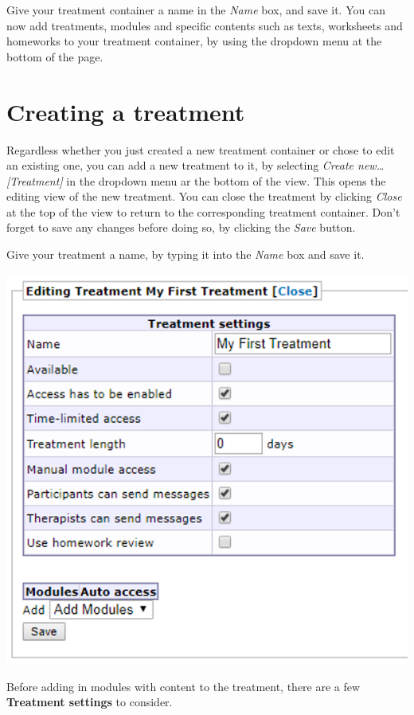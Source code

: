 \documentclass[
]{book}
\begin{document}
Give your treatment container a name in the \emph{Name} box, and save it.
You can now add treatments, modules and specific contents such as texts, worksheets and homeworks to your treatment container, by using the dropdown menu at the bottom of the page.

\section{Creating a treatment}\label{creating-a-treatment}

Regardless whether you just created a new treatment container or chose to edit an existing one, you can add a new treatment to it, by selecting \emph{Create new\ldots{} {[}Treatment{]}} in the dropdown menu ar the bottom of the view. This opens the editing view of the new treatment. You can close the treatment by clicking \emph{Close} at the top of the view to return to the corresponding treatment container. Don't forget to save any changes before doing so, by clicking the \emph{Save} button.

Give your treatment a name, by typing it into the \emph{Name} box and save it.

\includegraphics{images/new-images/treatmentTreatSettings.png}

Before adding in modules with content to the treatment, there are a few \textbf{Treatment settings} to consider.
\end{document}
